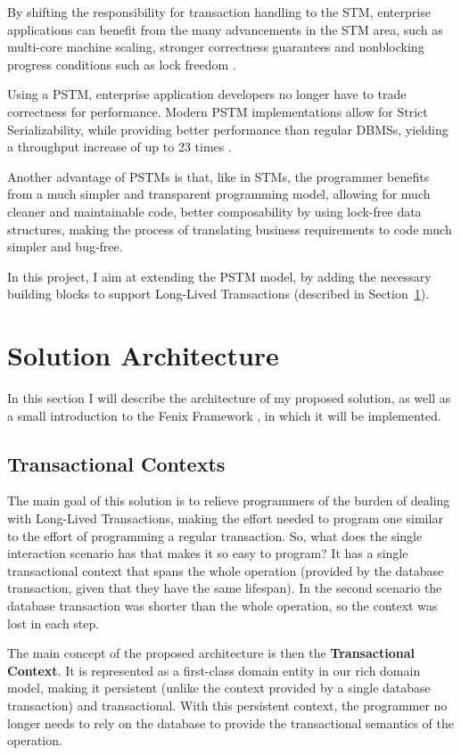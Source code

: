 \documentclass{llncs}
\begin{document}
By shifting the responsibility for transaction handling to the STM,
enterprise applications can benefit from the many advancements in the
STM area, such as multi-core machine scaling, stronger correctness
guarantees and nonblocking progress conditions such as lock freedom
\cite{fernandes2011lock}.

Using a PSTM, enterprise application developers no longer have to
trade correctness for performance. Modern PSTM implementations allow
for Strict Serializability, while providing better performance than
regular DBMSs, yielding a throughput increase of up to 23 times
\cite{fernandes2011strict}.

Another advantage of PSTMs is that, like in STMs, the programmer
benefits from a much simpler and transparent programming model,
allowing for much cleaner and maintainable code, better composability
by using lock-free data structures, making the process of translating
business requirements to code much simpler and bug-free.

In this project, I aim at extending the PSTM model, by adding the
necessary building blocks to support Long-Lived Transactions
(described in Section~\ref{sec:arch}).

\section{Solution Architecture}
\label{sec:arch}

In this section I will describe the architecture of my proposed
solution, as well as a small introduction to the Fenix Framework
\cite{fernandes2011strict}, in which it will be implemented.

\subsection{Transactional Contexts}

The main goal of this solution is to relieve programmers of the burden
of dealing with Long-Lived Transactions, making the effort needed to
program one similar to the effort of programming a regular
transaction. So, what does the single interaction scenario has that
makes it so easy to program? It has a single transactional context
that spans the whole operation (provided by the database transaction,
given that they have the same lifespan). In the second scenario the
database transaction was shorter than the whole operation, so the
context was lost in each step.

The main concept of the proposed architecture is then the {\bf
  Transactional Context}. It is represented as a first-class domain
entity in our rich domain model, making it persistent (unlike the
context provided by a single database transaction) and
transactional. With this persistent context, the programmer no longer
needs to rely on the database to provide the transactional semantics
of the operation.
\end{document}
